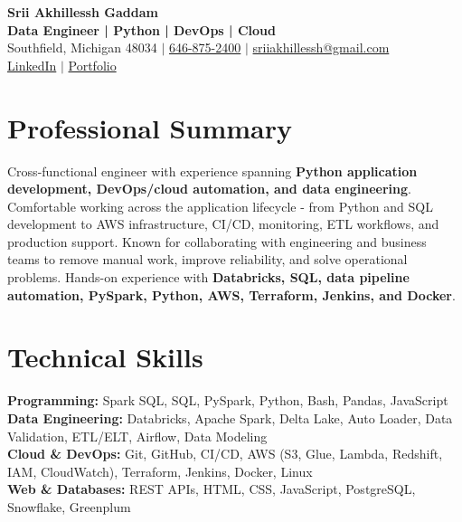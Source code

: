 \documentclass[letterpaper,10pt]{article}
\begin{document}
\fontsize{9.35pt}{10.45pt}\selectfont

\begin{center}
    {\LARGE \textbf{Srii Akhillessh Gaddam}} \\[-1pt]
    \textbf{Data Engineer | Python | DevOps | Cloud} \\[2pt]
    Southfield, Michigan 48034 $|$
    \href{tel:6468752400}{646-875-2400} $|$
    \href{mailto:sriiakhillessh@gmail.com}{sriiakhillessh@gmail.com} \\[1pt]
    \href{https://www.linkedin.com/in/srii-akhiilessh-gaddam-b48668191/}{LinkedIn} $|$
    \href{https://sriiakhillesshg.github.io/portfolio/}{Portfolio}
\end{center}
\vspace{-8pt}

\section{Professional Summary}
\small{Cross-functional engineer with experience spanning \textbf{Python application development, DevOps/cloud automation, and data engineering}. Comfortable working across the application lifecycle - from Python and SQL development to AWS infrastructure, CI/CD, monitoring, ETL workflows, and production support. Known for collaborating with engineering and business teams to remove manual work, improve reliability, and solve operational problems. Hands-on experience with \textbf{Databricks, SQL, data pipeline automation, PySpark, Python, AWS, Terraform, Jenkins, and Docker}.}

\section{Technical Skills}
\small{
\textbf{Programming:} Spark SQL, SQL, PySpark, Python, Bash, Pandas, JavaScript \\
\textbf{Data Engineering:} Databricks, Apache Spark, Delta Lake, Auto Loader, Data Validation, ETL/ELT, Airflow, Data Modeling \\
\textbf{Cloud \& DevOps:} Git, GitHub, CI/CD, AWS (S3, Glue, Lambda, Redshift, IAM, CloudWatch), Terraform, Jenkins, Docker, Linux \\
\textbf{Web \& Databases:} REST APIs, HTML, CSS, JavaScript, PostgreSQL, Snowflake, Greenplum
}

\end{document}
